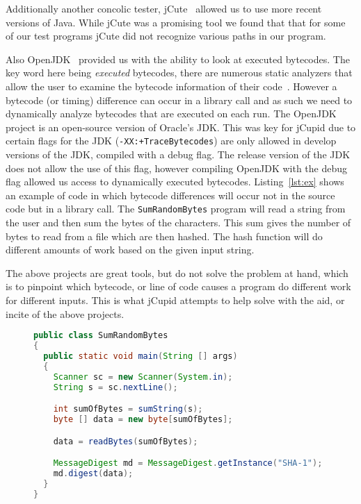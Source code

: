 Additionally another concolic tester, jCute~\cite{conf/cav/SenA06} allowed us to
use more recent versions of Java. While jCute was a promising tool we found that
that for some of our test programs jCute did not recognize various paths in our
program. 

Also OpenJDK~\cite{OpenJDK} provided us with the ability to look at executed
bytecodes. The key word here being \emph{executed} bytecodes, there are numerous
static analyzers that allow the user to examine the bytecode information of
their code~\cite{vallee1999soot}. However a bytecode (or timing) difference can
occur in a library call and as such we need to dynamically analyze bytecodes
that are executed on each run. The OpenJDK project is an open-source version of
Oracle's JDK. This was key for jCupid due to certain flags for the JDK
(\texttt{-XX:+TraceBytecodes}) are only allowed in develop versions of the JDK,
compiled with a debug flag. The release version of the JDK does not allow the
use of this flag, however compiling OpenJDK with the debug flag allowed us
access to dynamically executed bytecodes. Listing~\ref{lst:ex} shows an example
of code in which bytecode differences will occur not in the source code but in a
library call. The \texttt{SumRandomBytes} program will read a string from the
user and then sum the bytes of the characters. This sum gives the number of
bytes to read from a file which are then hashed. The hash function will do
different amounts of work based on the given input string. 

The above projects are great tools, but do not solve the problem at hand, which
is to pinpoint which bytecode, or line of code causes a program do different
work for different inputs. This is what jCupid attempts to help solve with the
aid, or incite of the above projects. 

\begin{figure}[t]
  \begin{center}
    \begin{lstlisting}[caption={Example of code with bytecode difference in
    library call},label={lst:ex},language=Java] 
public class SumRandomBytes
{
  public static void main(String [] args)
  {
    Scanner sc = new Scanner(System.in);
    String s = sc.nextLine();

    int sumOfBytes = sumString(s);
    byte [] data = new byte[sumOfBytes];

    data = readBytes(sumOfBytes);

    MessageDigest md = MessageDigest.getInstance("SHA-1");
    md.digest(data);
  }
}
    \end{lstlisting}
  \end{center}
\end{figure}
